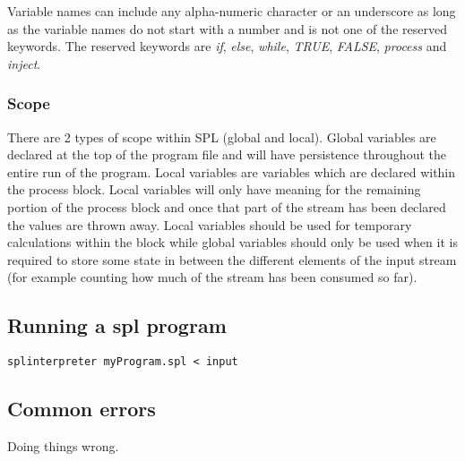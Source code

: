\documentclass[11pt,a4paper,oneside]{report}
\begin{document}
Variable names can include any alpha-numeric character or an underscore as long as the variable names do not start with a number and is not one of the reserved keywords. The reserved keywords are \textit{if}, \textit{else}, \textit{while}, \textit{TRUE}, \textit{FALSE}, \textit{process} and \textit{inject}.

\subsubsection*{Scope}

There are 2 types of scope within SPL (global and local). Global variables are declared at the top of the program file and will have persistence throughout the entire run of the program. Local variables are variables which are declared within the process block. Local variables will only have meaning for the remaining portion of the process block and once that part of the stream has been declared the values are thrown away. Local variables should be used for temporary calculations within the block while global variables should only be used when it is required to store some state in between the different elements of the input stream (for example counting how much of the stream has been consumed so far).

\subsection*{Running a spl program}

\begin{lstlisting}[frame=single]
splinterpreter myProgram.spl < input
\end{lstlisting}

\subsection*{Common errors}

Doing things wrong.
\end{document}
